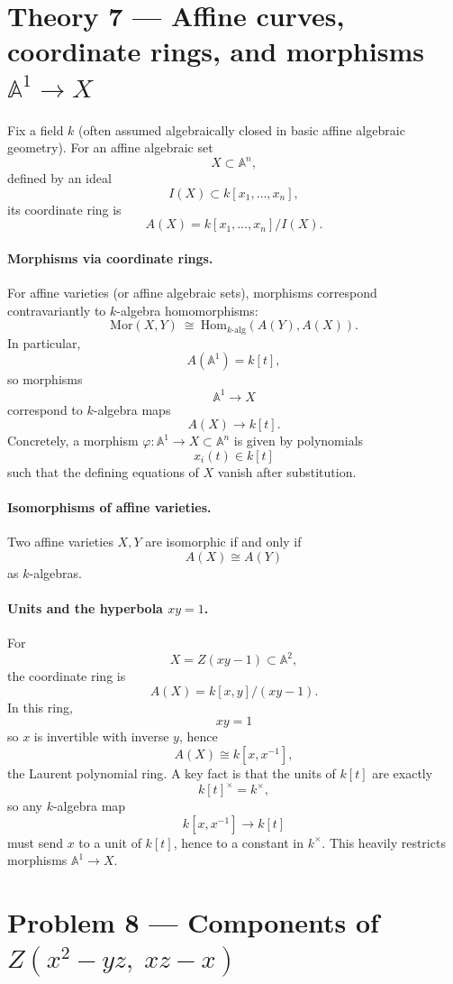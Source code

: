 \documentclass[12pt,a4paper]{article}
\theoremstyle{plain}
\theoremstyle{definition}      %
\begin{document}
\section*{Theory 7 — Affine curves, coordinate rings, and morphisms $\mathbb{A}^1 \to X$}

Fix a field $k$ (often assumed algebraically closed in basic affine algebraic geometry).
For an affine algebraic set
\[
X \subset \mathbb{A}^n,
\]
defined by an ideal
\[
I(X) \subset k[x_1,\dots,x_n],
\]
its coordinate ring is
\[
A(X)
=
k[x_1,\dots,x_n]/I(X).
\]

\paragraph{Morphisms via coordinate rings.}
For affine varieties (or affine algebraic sets), morphisms correspond contravariantly to $k$-algebra homomorphisms:
\[
\mathrm{Mor}(X,Y)
\ \cong\
\mathrm{Hom}_{k\text{-alg}}(A(Y),A(X)).
\]
In particular,
\[
A(\mathbb{A}^1)=k[t],
\]
so morphisms
\[
\mathbb{A}^1 \to X
\]
correspond to $k$-algebra maps
\[
A(X)\to k[t].
\]
Concretely, a morphism $\varphi:\mathbb{A}^1\to X\subset \mathbb{A}^n$ is given by polynomials
\[
x_i(t)\in k[t]
\]
such that the defining equations of $X$ vanish after substitution.

\paragraph{Isomorphisms of affine varieties.}
Two affine varieties $X,Y$ are isomorphic if and only if
\[
A(X)\cong A(Y)
\]
as $k$-algebras.

\paragraph{Units and the hyperbola $xy=1$.}
For
\[
X=Z(xy-1)\subset \mathbb{A}^2,
\]
the coordinate ring is
\[
A(X)
=
k[x,y]/(xy-1).
\]
In this ring,
\[
xy=1
\]
so $x$ is invertible with inverse $y$, hence
\[
A(X)\cong k[x,x^{-1}],
\]
the Laurent polynomial ring.
A key fact is that the units of $k[t]$ are exactly
\[
k[t]^\times = k^\times,
\]
so any $k$-algebra map
\[
k[x,x^{-1}] \to k[t]
\]
must send $x$ to a unit of $k[t]$, hence to a constant in $k^\times$.
This heavily restricts morphisms $\mathbb{A}^1\to X$.

\section*{Problem 8 — Components of $Z(x^2-yz,\;xz-x)$}
\end{document}
